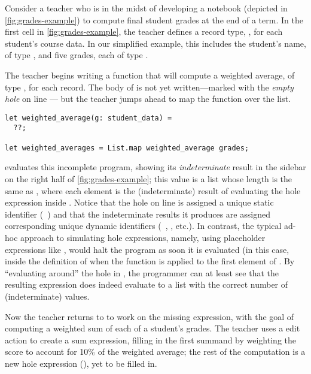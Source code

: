 

Consider a teacher who is in the midst of developing a \HazelnutLive{} notebook
(depicted in \autoref{fig:grades-example}) to compute final student grades at
the end of a term.
%
In the first cell in \autoref{fig:grades-example}, the teacher defines a record
type, , for each student's course data.
%
In our simplified example, this includes the student's name, of type
, and five grades, each of type .

%
The teacher begins writing a  function that will
compute a weighted average, of type , for each 
record.
%
The body of  is not yet written---marked with the
\emph{empty hole} on line --- but the teacher jumps ahead to map the
function over the  list.

\begin{lstlisting}
let weighted_average(g: student_data) =
  ??;

let weighted_averages = List.map weighted_average grades;
\end{lstlisting}

\noindent
%
\HazelnutLive{} evaluates this incomplete program, showing its
\emph{indeterminate} result in the sidebar on the right half of
\autoref{fig:grades-example}; this value is a list whose length is the same as
, where each element is the (indeterminate) result of evaluating the
hole expression inside .
%
Notice that the hole on line  is assigned a unique static identifier
(\ie{}~) and that the indeterminate results it produces are assigned
corresponding unique dynamic identifiers (\ie{}~, , etc.).
%
In contrast, the typical ad-hoc approach to simulating hole expressions, namely,
using placeholder expressions like , would halt
the program as soon it is evaluated (in this case, inside the definition of
 when the function is applied to the first element of .
%
By ``evaluating around'' the hole in \HazelnutLive{}, the programmer can at
least see that the resulting expression does indeed evaluate to a list with the
correct number of (indeterminate) values.

Now the teacher returns to  to work on the missing
expression, with the goal of computing a weighted sum of each of a student's
grades.
%
The teacher uses a \HazelnutLive{} edit action to create a sum expression,
filling in the first summand by weighting the  score to account for 10\%
of the weighted average; the rest of the computation is a new hole expression
(), yet to be filled in.

